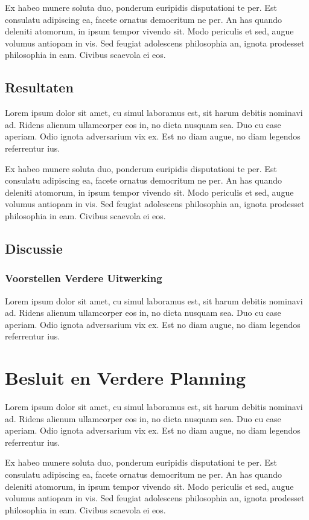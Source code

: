 \documentclass[a4paper,11pt]{article}
\begin{document}
		Ex habeo munere soluta duo, ponderum euripidis disputationi te per. Est consulatu adipiscing ea, facete ornatus democritum ne per. An has quando deleniti atomorum, in ipsum tempor vivendo sit. Modo periculis et sed, augue volumus antiopam in vis. Sed feugiat adolescens philosophia an, ignota prodesset philosophia in eam. Civibus scaevola ei eos.
	\subsection{Resultaten}
		Lorem ipsum dolor sit amet, cu simul laboramus est, sit harum debitis nominavi ad. Ridens alienum ullamcorper eos in, no dicta nusquam sea. Duo cu case aperiam. Odio ignota adversarium vix ex. Est no diam augue, no diam legendos referrentur ius.
		
		Ex habeo munere soluta duo, ponderum euripidis disputationi te per. Est consulatu adipiscing ea, facete ornatus democritum ne per. An has quando deleniti atomorum, in ipsum tempor vivendo sit. Modo periculis et sed, augue volumus antiopam in vis. Sed feugiat adolescens philosophia an, ignota prodesset philosophia in eam. Civibus scaevola ei eos.
	\subsection{Discussie}
	\subsubsection{Voorstellen Verdere Uitwerking}
		Lorem ipsum dolor sit amet, cu simul laboramus est, sit harum debitis nominavi ad. Ridens alienum ullamcorper eos in, no dicta nusquam sea. Duo cu case aperiam. Odio ignota adversarium vix ex. Est no diam augue, no diam legendos referrentur ius.
	
	
	\section{Besluit en Verdere Planning}
		Lorem ipsum dolor sit amet, cu simul laboramus est, sit harum debitis nominavi ad. Ridens alienum ullamcorper eos in, no dicta nusquam sea. Duo cu case aperiam. Odio ignota adversarium vix ex. Est no diam augue, no diam legendos referrentur ius.
		
		Ex habeo munere soluta duo, ponderum euripidis disputationi te per. Est consulatu adipiscing ea, facete ornatus democritum ne per. An has quando deleniti atomorum, in ipsum tempor vivendo sit. Modo periculis et sed, augue volumus antiopam in vis. Sed feugiat adolescens philosophia an, ignota prodesset philosophia in eam. Civibus scaevola ei eos.
	
\end{document}
